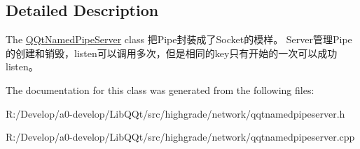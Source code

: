 \subsection{Detailed Description}
The \mbox{\hyperlink{class_q_qt_named_pipe_server}{Q\+Qt\+Named\+Pipe\+Server}} class 把\+Pipe封装成了\+Socket的模样。 Server管理\+Pipe的创建和销毁，listen可以调用多次，但是相同的key只有开始的一次可以成功listen。 

The documentation for this class was generated from the following files\+:\begin{DoxyCompactItemize}
\item 
R\+:/\+Develop/a0-\/develop/\+Lib\+Q\+Qt/src/highgrade/network/qqtnamedpipeserver.\+h\item 
R\+:/\+Develop/a0-\/develop/\+Lib\+Q\+Qt/src/highgrade/network/qqtnamedpipeserver.\+cpp\end{DoxyCompactItemize}
